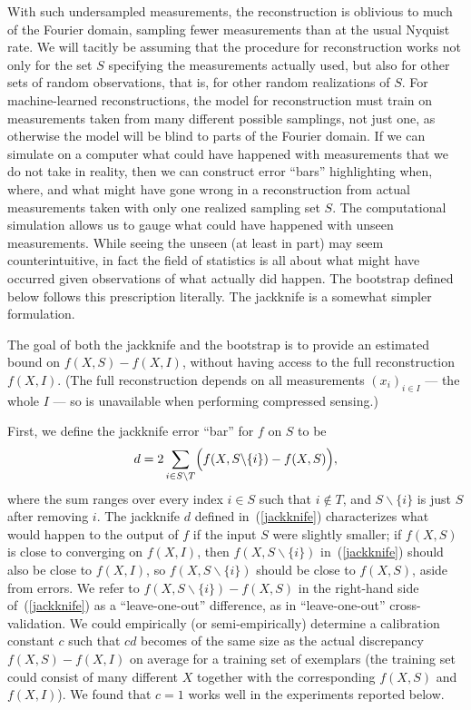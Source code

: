 \documentclass[article]{jdssv}
\begin{document}
With such undersampled measurements, the reconstruction is oblivious to much
of the Fourier domain, sampling fewer measurements
than at the usual Nyquist rate.
We will tacitly be assuming that the procedure for reconstruction works
not only for the set $S$ specifying the measurements actually used,
but also for other sets of random observations, that is,
for other random realizations of $S$.
For machine-learned reconstructions, the model for reconstruction must train
on measurements taken from many different possible samplings, not just one,
as otherwise the model will be blind to parts of the Fourier domain.
If we can simulate on a computer what could have happened with measurements
that we do not take in reality, then we can construct error ``bars''
highlighting when, where, and what might have gone wrong in a reconstruction
from actual measurements taken with only one realized sampling set $S$.
The computational simulation allows us to gauge what could have happened
with unseen measurements.
While seeing the unseen (at least in part) may seem counterintuitive,
in fact the field of statistics is all about what might have occurred
given observations of what actually did happen.
The bootstrap defined below follows this prescription literally.
The jackknife is a somewhat simpler formulation.

The goal of both the jackknife and the bootstrap is to provide an estimated
bound on $f(X, S) - f(X, I)$, without having access to the full reconstruction
$f(X, I)$. (The full reconstruction depends on all measurements
$(x_i)_{i \in I}$ --- the whole $I$ --- so is unavailable when performing
compressed sensing.)

First, we define the jackknife error ``bar'' for $f$ on $S$ to be
%
\begin{equation}
\label{jackknife}
d = 2 \sum_{i \in S \backslash T}
    \Bigl( f(X, S \backslash \{i\}) - f(X, S) \Bigr),
\end{equation}
%
where the sum ranges over every index $i \in S$ such that $i \notin T$,
and $S \backslash \{i\}$ is just $S$ after removing $i$.
The jackknife $d$ defined in~(\ref{jackknife}) characterizes
what would happen to the output of $f$ if the input $S$ were slightly smaller;
if $f(X, S)$ is close to converging on $f(X, I)$,
then $f(X, S \backslash \{i\})$ in~(\ref{jackknife}) should also be close
to $f(X, I)$, so $f(X, S \backslash \{i\})$ should be close to $f(X, S)$,
aside from errors.
We refer to $f(X, S \backslash \{i\}) - f(X, S)$ in the right-hand side
of~(\ref{jackknife}) as a ``leave-one-out'' difference,
as in ``leave-one-out'' cross-validation.
We could empirically (or semi-empirically) determine a calibration constant $c$
such that $cd$ becomes of the same size as the actual discrepancy
$f(X, S) - f(X, I)$ on average for a training set of exemplars
(the training set could consist of many different $X$ together
with the corresponding $f(X, S)$ and $f(X,I)$).
We found that $c = 1$ works well in the experiments reported below.
\end{document}

